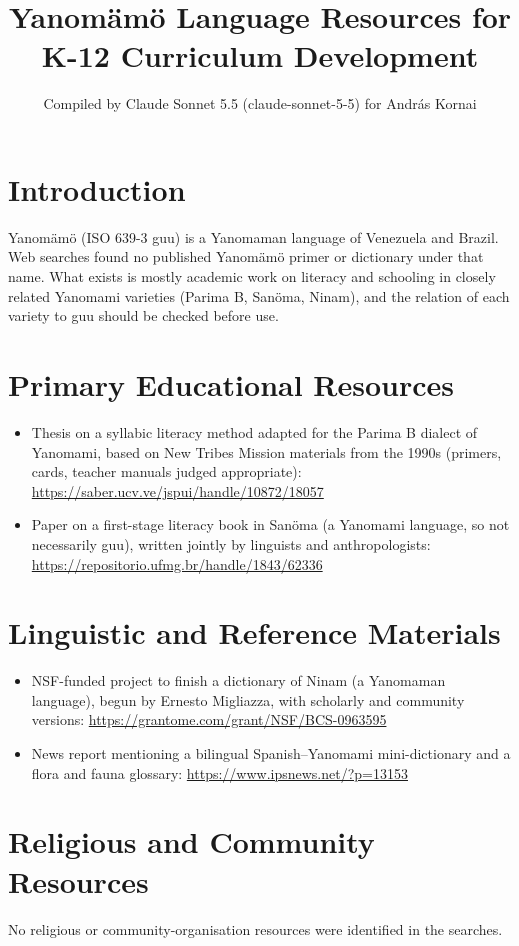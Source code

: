 \documentclass[12pt]{article}
\title{Yanom\"am\"o Language Resources for K-12 Curriculum Development}
\author{Compiled by Claude Sonnet 5.5 (claude-sonnet-5-5) for Andr\'as Kornai}
\date{}
\begin{document}
\maketitle

\section{Introduction}
Yanom\"am\"o (ISO 639-3 guu) is a Yanomaman language of Venezuela and Brazil. Web searches found no published Yanom\"am\"o primer or dictionary under that name. What exists is mostly academic work on literacy and schooling in closely related Yanomami varieties (Parima B, Sanöma, Ninam), and the relation of each variety to guu should be checked before use.

\section{Primary Educational Resources}
\begin{itemize}
\item Thesis on a syllabic literacy method adapted for the Parima B dialect of Yanomami, based on New Tribes Mission materials from the 1990s (primers, cards, teacher manuals judged appropriate): \url{https://saber.ucv.ve/jspui/handle/10872/18057}
\item Paper on a first-stage literacy book in Sanöma (a Yanomami language, so not necessarily guu), written jointly by linguists and anthropologists: \url{https://repositorio.ufmg.br/handle/1843/62336}
\end{itemize}

\section{Linguistic and Reference Materials}
\begin{itemize}
\item NSF-funded project to finish a dictionary of Ninam (a Yanomaman language), begun by Ernesto Migliazza, with scholarly and community versions: \url{https://grantome.com/grant/NSF/BCS-0963595}
\item News report mentioning a bilingual Spanish--Yanomami mini-dictionary and a flora and fauna glossary: \url{https://www.ipsnews.net/?p=13153}
\end{itemize}

\section{Religious and Community Resources}
No religious or community-organisation resources were identified in the searches.
\end{document}
